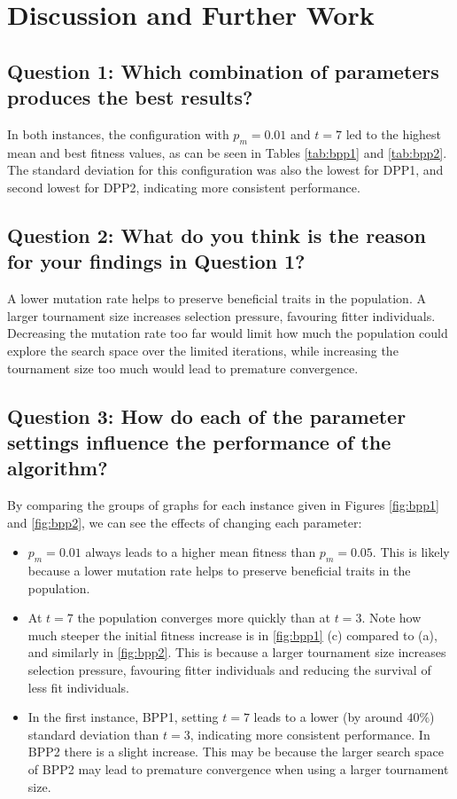 \documentclass[conference]{IEEEtran}
\begin{document}
\section{Discussion and Further Work}

\subsection{Question 1: Which combination of parameters produces the best results?}
In both instances, the configuration with \(p_m=0.01\) and \(t=7\) led to the highest mean and best fitness values, as can be seen in Tables \ref{tab:bpp1} and \ref{tab:bpp2}. The standard deviation for this configuration was also the lowest for DPP1, and second lowest for DPP2, indicating more consistent performance.

\subsection{Question 2: What do you think is the reason for your findings in Question 1?}
A lower mutation rate helps to preserve beneficial traits in the population. A larger tournament size increases selection pressure, favouring fitter individuals. Decreasing the mutation rate too far would limit how much the population could explore the search space over the limited iterations, while increasing the tournament size too much would lead to premature convergence.

\subsection{Question 3: How do each of the parameter settings influence the performance of the algorithm?}
By comparing the groups of graphs for each instance given in Figures \ref{fig:bpp1} and \ref{fig:bpp2}, we can see the effects of changing each parameter:
\begin{itemize}
    \item \(p_m = 0.01\) always leads to a higher mean fitness than \(p_m = 0.05\). This is likely because a lower mutation rate helps to preserve beneficial traits in the population.
    \item At \(t=7\) the population converges more quickly than at \(t=3\). Note how much steeper the initial fitness increase is in \ref{fig:bpp1} (c) compared to (a), and similarly in \ref{fig:bpp2}. This is because a larger tournament size increases selection pressure, favouring fitter individuals and reducing the survival of less fit individuals.
    \item In the first instance, BPP1, setting \(t=7\) leads to a lower (by around \(40\%\)) standard deviation than \(t=3\), indicating more consistent performance. In BPP2 there is a slight increase. This may be because the larger search space of BPP2 may lead to premature convergence when using a larger tournament size.
\end{itemize}
\end{document}
